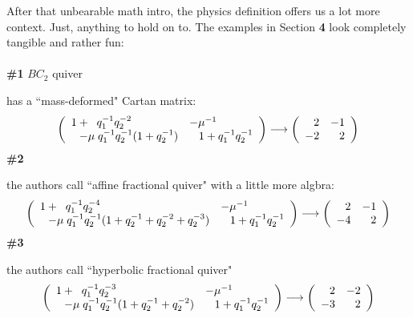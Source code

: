 \documentclass[12pt]{article}
\begin{document}
\noindent After that unbearable math intro, the physics definition offers us a lot more context.  Just, anything to hold on to.  The examples in Section \textbf{4} look completely tangible and rather fun: \\ \\
\textbf{\#1} $BC_2$ quiver
 has a ``mass-deformed" Cartan matrix:
$$ \left(  \begin{array}{ll} 
1 + \;\; q_1^{-1}q_2^{-2} & - \mu^{-1} \\ 
\hspace{0.1in}-\mu \; q_1^{-1}q_2^{-1}(1+q_2^{-1}) & \;\;\;1 + q_1^{-1}q_2^{-1}
\end{array} \right) \longrightarrow 
\left(  \begin{array}{rr} 
2 & -1 \\ -2 & 2
\end{array} \right)
$$
\textbf{\#2}  the authors call ``affine fractional quiver" with a little more algbra:
$$ \left(  \begin{array}{ll} 
1 + \;\; q_1^{-1}q_2^{-4} & - \mu^{-1} \\ 
\hspace{0.1in}-\mu \; q_1^{-1}q_2^{-1}(1+q_2^{-1}+q_2^{-2} + q_2^{-3}) & \;\;\;1 + q_1^{-1}q_2^{-1}
\end{array} \right) \longrightarrow 
\left(  \begin{array}{rr} 
2 & -1 \\ -4 & 2
\end{array} \right)
$$
\textbf{\#3}  the authors call ``hyperbolic fractional quiver"
$$ \left(  \begin{array}{ll} 
1 + \;\; q_1^{-1}q_2^{-3} & - \mu^{-1} \\ 
\hspace{0.1in}-\mu \; q_1^{-1}q_2^{-1}(1+q_2^{-1}+q_2^{-2} ) & \;\;\;1 + q_1^{-1}q_2^{-1}
\end{array} \right) \longrightarrow 
\left(  \begin{array}{rr} 
2 & -2 \\ -3 & 2
\end{array} \right)
$$
\end{document}
